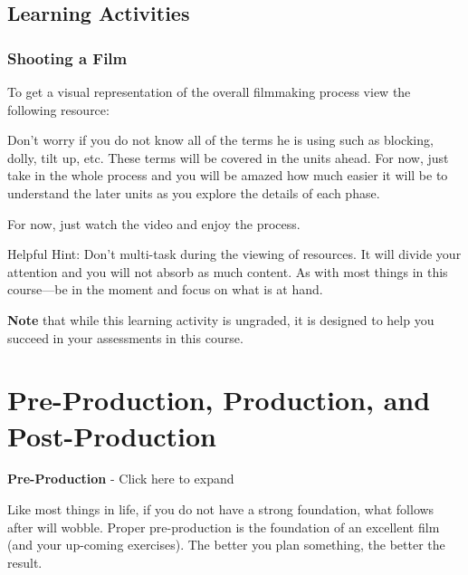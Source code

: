 \documentclass[
]{book}
\begin{document}
\hypertarget{learning-activities-3}{%
\subsection*{Learning Activities}\label{learning-activities-3}}

\begin{reflect}
\hypertarget{shooting-a-film}{%
\subsubsection*{Shooting a Film}\label{shooting-a-film}}

To get a visual representation of the overall filmmaking process view the following resource:

Don't worry if you do not know all of the terms he is using such as blocking, dolly, tilt up, etc. These terms will be covered in the units ahead. For now, just take in the whole process and you will be amazed how much easier it will be to understand the later units as you explore the details of each phase.

For now, just watch the video and enjoy the process.

Helpful Hint: Don't multi-task during the viewing of resources. It will divide your attention and you will not absorb as much content. As with most things in this course---be in the moment and focus on what is at hand.
\end{reflect}

\begin{caution}
\textbf{Note} that while this learning activity is ungraded, it is designed to help you succeed in your assessments in this course.
\end{caution}

\hypertarget{pre-production-production-and-post-production}{%
\section{Pre-Production, Production, and Post-Production}\label{pre-production-production-and-post-production}}

\textbf{Pre-Production} - Click here to expand

Like most things in life, if you do not have a strong foundation, what follows after will wobble. Proper pre-production is the foundation of an excellent film (and your up-coming exercises). The better you plan something, the better the result.
\end{document}
